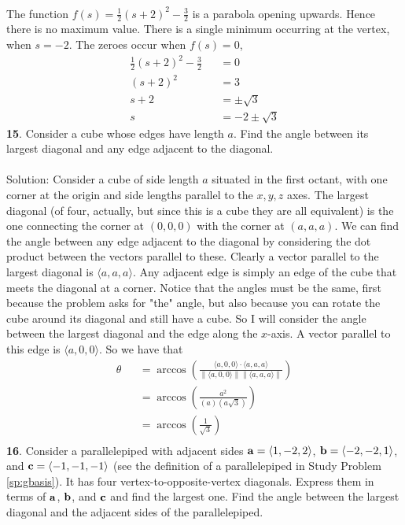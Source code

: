 \documentclass[12pt]{amsbook}
\newcommand{\la}{\langle}
\newcommand{\ra}{\rangle}
\begin{document}
\\
The function $f(s)=\frac 12(s+2)^2-\frac 32$ is a parabola opening upwards. Hence there is no maximum value. There is a single minimum occurring at the vertex, when $s=-2$. The zeroes occur when $f(s)=0$, 
\begin{eqnarray*}
\frac 12(s+2)^2-\frac 32&&=0\\
(s+2)^2&&=3\\
s+2&&=\pm \sqrt{3}\\
s&&=-2\pm \sqrt{3}
\end{eqnarray*}
{\small\bf 15}. Consider a cube whose edges have length $a$. Find the
angle between its largest diagonal and any edge adjacent to the
diagonal.\\
\\
{\sc Solution}:
Consider a cube of side length $a$ situated in the first octant, with one corner at the origin and side lengths parallel to the $x,y,z$ axes. The largest diagonal (of four, actually, but since this is a cube they are all equivalent) is the one connecting the corner at $(0,0,0)$ with the corner at $(a,a,a)$. We can find the angle between any edge adjacent to the diagonal by considering the dot product between the vectors parallel to these. Clearly a vector parallel to the largest diagonal is $\la a,a,a \ra$. Any adjacent edge is simply an edge of the cube that meets the diagonal at a corner. Notice that the angles must be the same, first because the problem asks for "the" angle, but also because you can rotate the cube around its diagonal and still have a cube. So I will consider the angle between the largest diagonal and the edge along the $x$-axis. A vector parallel to this edge is $\la a,0,0 \ra$. So we have that
\begin{eqnarray*}
\theta &&= \arccos(\frac{ \la a,0,0 \ra \cdot \la a,a,a \ra} {\|\la a,0,0 \ra \| \| \la a,a,a \ra \|})\\
&&= \arccos(\frac{a^2}{(a)(a\sqrt{3})})\\
&&= \arccos(\frac{1}{\sqrt{3}})\\
\end{eqnarray*}
{\small\bf 16}. Consider a parallelepiped with adjacent 
sides ${\bf a}=\la 1,-2,2\ra$, ${\bf b}=\la -2,-2,1\ra$,
and ${\bf c}=\la -1,-1,-1\ra$ (see the definition 
of a parallelepiped in Study Problem \ref{sp:gbasis}).
It has four vertex-to-opposite-vertex diagonals.
Express them in terms of ${\bf a}$, ${\bf b}$,
and ${\bf c}$ and find the largest one.
Find the angle between the largest diagonal and the adjacent
sides of the parallelepiped.\\
\end{document}
